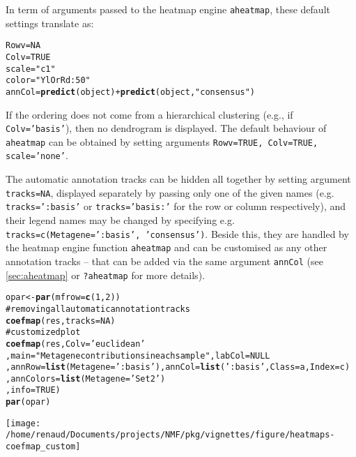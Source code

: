 \documentclass[a4paper]{article}\usepackage{graphicx, color}
\makeatletter
\def\maxwidth{ %
  \ifdim\Gin@nat@width>\linewidth
    \linewidth
  \else
    \Gin@nat@width
  \fi
}
\newcommand{\hlfunctioncall}[1]{\textcolor[rgb]{0.501960784313725,0,0.329411764705882}{\textbf{#1}}}%
\newcommand{\hlstring}[1]{\textcolor[rgb]{0.6,0.6,1}{#1}}%
\newcommand{\hlcomment}[1]{\textcolor[rgb]{0.180392156862745,0.6,0.341176470588235}{#1}}%
\newenvironment{kframe}{%
 \def\at@end@of@kframe{}%
 \ifinner\ifhmode%
  \def\at@end@of@kframe{\end{minipage}}%
  \begin{minipage}{\columnwidth}%
 \fi\fi%
 \def\FrameCommand##1{\hskip\@totalleftmargin \hskip-\fboxsep
 \colorbox{shadecolor}{##1}\hskip-\fboxsep
     \hskip-\linewidth \hskip-\@totalleftmargin \hskip\columnwidth}%
 \MakeFramed {\advance\hsize-\width
   \@totalleftmargin\z@ \linewidth\hsize
   \@setminipage}}%
 {\par\unskip\endMakeFramed%
 \at@end@of@kframe}
\newenvironment{knitrout}{}{} %
\let\code=\texttt
\makeatother
\begin{document}
In term of arguments passed to the heatmap engine \code{aheatmap}, these default 
settings translate as:

\begin{knitrout}
\color{fgcolor}\begin{kframe}
\begin{alltt}
Rowv = NA
Colv = TRUE
scale = \hlstring{"c1"}
color = \hlstring{"YlOrRd:50"}
annCol = \hlfunctioncall{predict}(object) + \hlfunctioncall{predict}(object, \hlstring{"consensus"})
\end{alltt}
\end{kframe}
\end{knitrout}


If the ordering does not come from a hierarchical clustering (e.g., if
\code{Colv='basis'}), then no dendrogram is displayed.
The default behaviour of \code{aheatmap} can be obtained by setting arguments 
\code{Rowv=TRUE, Colv=TRUE, scale='none'}.

\medskip
The automatic annotation tracks can be hidden all together by setting argument 
\code{tracks=NA}, displayed separately by passing only one of the given names 
(e.g. \code{tracks=':basis'} or \code{tracks='basis:'} for the row or column respectively),
and their legend names may be changed by
specifying e.g. \code{tracks=c(Metagene=':basis', 'consensus')}.
Beside this, they are handled by the heatmap engine function \code{aheatmap} 
and can be customised as any other annotation tracks -- that can be added via 
the same argument \code{annCol} (see \cref{sec:aheatmap} or \code{?aheatmap} for
more details).

\begin{knitrout}
\color{fgcolor}\begin{kframe}
\begin{alltt}
opar <- \hlfunctioncall{par}(mfrow=\hlfunctioncall{c}(1,2))
\hlcomment{# removing all automatic annotation tracks}
\hlfunctioncall{coefmap}(res, tracks=NA)
\hlcomment{# customized plot}
\hlfunctioncall{coefmap}(res, Colv = \hlstring{'euclidean'}
	, main = \hlstring{"Metagene contributions in each sample"}, labCol = NULL
	, annRow = \hlfunctioncall{list}(Metagene=\hlstring{':basis'}), annCol = \hlfunctioncall{list}(\hlstring{':basis'}, Class=a, Index=c)
	, annColors = \hlfunctioncall{list}(Metagene=\hlstring{'Set2'})
	, info = TRUE)
\hlfunctioncall{par}(opar)
\end{alltt}
\end{kframe}\texttt{[image: /home/renaud/Documents/projects/NMF/pkg/vignettes/figure/heatmaps-coefmap\_custom]} 
\end{knitrout}
\end{document}
